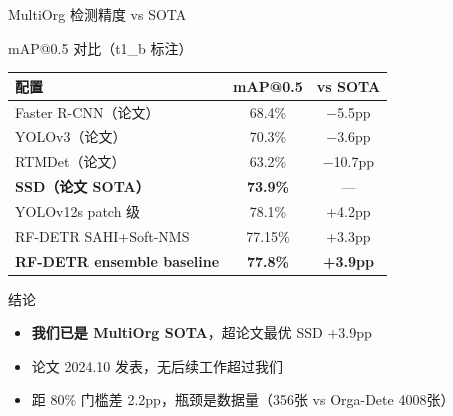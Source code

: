 \documentclass[aspectratio=169, 10pt]{beamer}
\begin{document}
\begin{frame}{MultiOrg 检测精度 vs SOTA}
  \begin{block}{mAP@0.5 对比（t1\_b 标注）}
    \begin{tabular}{lcc}
      \toprule
      配置 & mAP@0.5 & vs SOTA \\
      \midrule
      Faster R-CNN（论文） & 68.4\% & $-$5.5pp \\
      YOLOv3（论文） & 70.3\% & $-$3.6pp \\
      RTMDet（论文） & 63.2\% & $-$10.7pp \\
      \textbf{SSD（论文 SOTA）} & \textbf{73.9\%} & — \\
      \midrule
      YOLOv12s patch 级 & 78.1\% & +4.2pp \\
      RF-DETR SAHI+Soft-NMS & 77.15\% & +3.3pp \\
      \textbf{RF-DETR ensemble baseline} & \textbf{77.8\%} & \textbf{+3.9pp} \\
      \bottomrule
    \end{tabular}
  \end{block}
  \vspace{0em}
  \begin{alertblock}{结论}
    \begin{itemize}
      \item \textbf{我们已是 MultiOrg SOTA}，超论文最优 SSD +3.9pp
      \item 论文 2024.10 发表，无后续工作超过我们
      \item 距 80\% 门槛差 2.2pp，瓶颈是数据量（356张 vs Orga-Dete 4008张）
    \end{itemize}
  \end{alertblock}
\end{frame}
\end{document}

